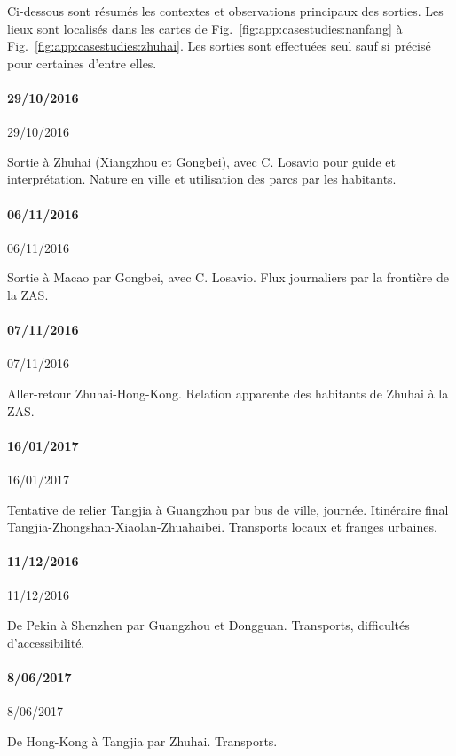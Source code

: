 Ci-dessous sont résumés les contextes et observations principaux des sorties. Les lieux sont localisés dans les cartes de Fig.~\ref{fig:app:casestudies:nanfang} à Fig.~\ref{fig:app:casestudies:zhuhai}. Les sorties sont effectuées seul sauf si précisé pour certaines d'entre elles.


\paragraph{29/10/2016}{29/10/2016}

Sortie à Zhuhai (Xiangzhou et Gongbei), avec C. Losavio pour guide et interprétation. Nature en ville et utilisation des parcs par les habitants.


\paragraph{06/11/2016}{06/11/2016}

Sortie à Macao par Gongbei, avec C. Losavio. Flux journaliers par la frontière de la ZAS.


\paragraph{07/11/2016}{07/11/2016}

Aller-retour Zhuhai-Hong-Kong. Relation apparente des habitants de Zhuhai à la ZAS.

\paragraph{16/01/2017}{16/01/2017}

Tentative de relier Tangjia à Guangzhou par bus de ville, journée. Itinéraire final Tangjia-Zhongshan-Xiaolan-Zhuahaibei. Transports locaux et franges urbaines.


\paragraph{11/12/2016}{11/12/2016}

De Pekin à Shenzhen par Guangzhou et Dongguan. Transports, difficultés d'accessibilité.


\paragraph{8/06/2017}{8/06/2017}

De Hong-Kong à Tangjia par Zhuhai. Transports.


